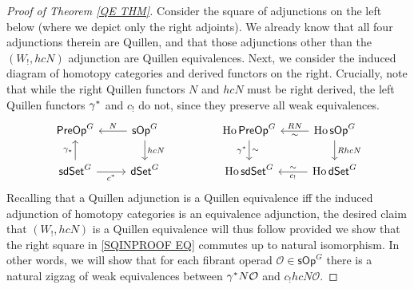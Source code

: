\documentclass[a4paper,10pt
,draft
]{article}%
\numberwithin{equation}{section}
\numberwithin{figure}{section}
\theoremstyle{definition} %
\DeclareMathOperator{\Ho}{Ho}
\renewcommand{\O}{\ensuremath{\mathcal O}}
\newcommand{\1}{\ensuremath{\mathbbm 1}}%
\begin{document}
\begin{proof}[Proof of Theorem \ref{QE THM}]
Consider the square of adjunctions on the left below 
(where we depict only the right adjoints).
We already know that all four adjunctions therein are Quillen,
and that those adjunctions other than the
$(W_!,hcN)$
adjunction are Quillen equivalences.
Next, 
we consider the induced diagram of homotopy categories
and derived functors on the right.
Crucially,
note that while 
the right Quillen functors $N$ and $hcN$
must be right derived, 
the left Quillen functors $\gamma^{\**}$ and $c_!$ do not, 
since they preserve all weak equivalences.
\begin{equation}\label{SQINPROOF EQ}
\begin{tikzcd}
	\mathsf{PreOp}^G 
&
	\mathsf{sOp}^G 
	\ar{l}[swap]{N}
	\ar{d}{hcN}
&&%
	\Ho \mathsf{PreOp}^G 
	\ar{d}[swap]{\gamma^{\**}}{\sim}
&
	\Ho \mathsf{sOp}^G 
	\ar{l}[swap]{R N}{\sim}
	\ar{d}{R hcN}
\\
	\mathsf{sdSet}^G
	\ar{u}{\gamma_{\**}}
	\ar{r}[swap]{c^{\**}}
&
	\mathsf{dSet}^G
&&%
	\Ho \mathsf{sdSet}^G
&
	\Ho \mathsf{dSet}^G
	\ar{l}{c_!}[swap]{\sim}
\end{tikzcd}
\end{equation}
Recalling that a Quillen adjunction
is a Quillen equivalence iff the induced adjunction of homotopy categories is an equivalence adjunction,
the desired claim that
$(W_!,hcN)$ is a Quillen equivalence will thus follow
provided we show that the right square in 
\eqref{SQINPROOF EQ}
commutes up to natural isomorphism.
In other words, we will show that
for each fibrant operad
$\O \in \mathsf{sOp}^G$
there is a natural zigzag of weak equivalences between 
$\gamma^{\**} N \O$ and
$c_! hcN \O$.


\end{proof}
\end{document}
